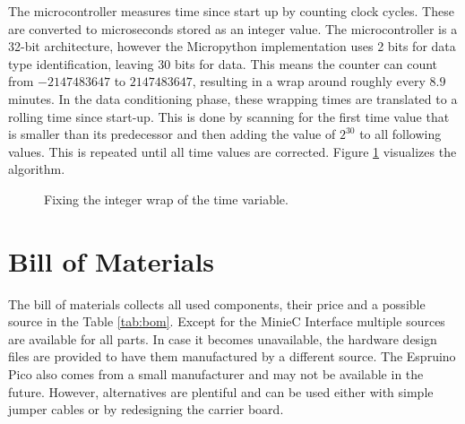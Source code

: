 The microcontroller measures time since start up by counting clock cycles. These are converted to microseconds stored as an integer value. The microcontroller is a 32-bit architecture, however the Micropython implementation uses 2 bits for data type identification, leaving 30 bits for data. This means the counter can count from $-2147483647$ to $2147483647$, resulting in a wrap around roughly every $8.9$ minutes. In the data conditioning phase, these wrapping times are translated to a rolling time since start-up. This is done by scanning for the first time value that is smaller than its predecessor and then adding the value of $2^{30}$ to all following values. This is repeated until all time values are corrected. Figure \ref{fig:wrap} visualizes the algorithm.\\

\begin{figure}[H]
	\begin{center}
		\caption{Fixing the integer wrap of the time variable.}
		\label{fig:wrap}
	\end{center}
\end{figure}

\section{Bill of Materials} \label{BOM}

The bill of materials collects all used components, their price and a possible source in the Table \ref{tab:bom}. Except for the MinieC Interface multiple sources are available for all parts. In case it becomes unavailable, the hardware design files are provided to have them manufactured by a different source. The Espruino Pico also comes from a small manufacturer and may not be available in the future. However, alternatives are plentiful and can be used either with simple jumper cables or by redesigning the carrier board.

